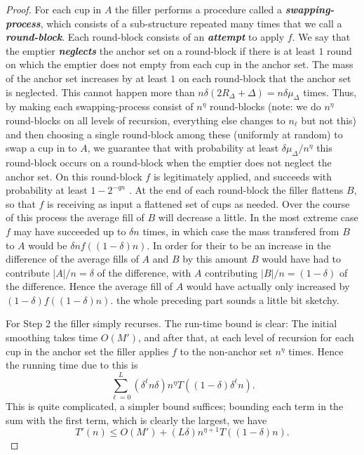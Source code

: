 \documentclass[twocolumn]{article}[10pt]
\newcommand{\defn}[1]{{\textit{\textbf{\boldmath #1}}}\xspace}
\begin{document}
\begin{proof}
  For each cup in $A$ the filler performs a procedure called a
  \defn{swapping-process}, which consists of a sub-structure repeated many
  times that we call a \defn{round-block}. Each round-block consists of an
  \defn{attempt} to apply $f$. We say that the emptier \defn{neglects} the
  anchor set on a round-block if there is at least $1$ round on which the
  emptier does not empty from each cup in the anchor set. The mass of the
  anchor set increases by at least $1$ on each round-block that the anchor set
  is neglected. This cannot happen more than $n\delta(2R_\Delta + \Delta) =
  n\delta\mu_\Delta$ times. Thus, by making each swapping-process consist of
  $n^{\eta}$ round-blocks (note: we do $n^{\eta}$ round-blocks on all levels of
  recursion, everything else changes to $n_\ell$ but not this) and then
  choosing a single round-block
  among these (uniformly at random) to swap a cup in to $A$, we guarantee that
  with probability at least $\delta\mu_\Delta/n^\eta$ this round-block occurs
  on a round-block when the emptier
  does not neglect the anchor set. On this round-block $f$ is legitimately
  applied, and succeeds with probability at least $1-2^{-qn}$ . At the end of
  each round-block the filler flattens $B$, so that $f$ is receiving as input a
  flattened set of cups as needed. Over the course of this process the average
  fill of $B$ will decrease a little. In the most extreme case $f$ may have
  succeeded up to $\delta n$ times, in which case the mass transfered from $B$
  to $A$ would be $\delta n f((1-\delta) n)$. In order for their to be an
  increase in the difference of the average fills of $A$ and $B$ by this amount
  $B$ would have had to contribute $|A|/n = \delta$ of the difference, with $A$
  contributing $|B|/n=(1-\delta)$ of the difference. Hence the average fill of
  $A$ would have actually only increased by $(1-\delta) f((1-\delta)n)$.
  {\color{red} the whole preceding part sounds a little bit sketchy.}

  For Step 2 the filler simply recurses. 
  The run-time bound is clear: The initial smoothing takes time $O(M')$, and
  after that, at each level of recursion for each cup in the anchor set the
  filler applies $f$ to the non-anchor set $n^\eta$ times. Hence the running
  time due to this is 
  $$\sum_{\ell=0}^L (\delta^\ell n\delta) n^\eta T((1-\delta)\delta^\ell n).$$
  This is quite complicated, a simpler bound suffices; bounding each term in
  the sum with the first term, which is clearly the largest, we have
  $$T'(n) \le O(M') + (L\delta)n^{\eta+1} T((1-\delta)n).$$


\end{proof}
\end{document}
